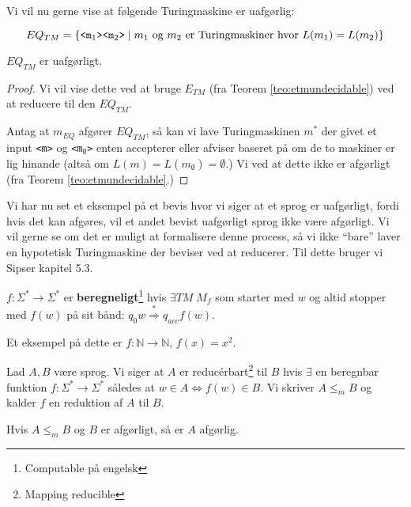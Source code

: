 Vi vil nu gerne vise at følgende Turingmaskine er uafgørlig:

\begin{equation*}
	EQ_{TM} = \{\text{\texttt{<m$_1$><m$_2$>}} \mid m_{1} \text{ og } m_{2} \text{ er Turingmaskiner hvor } L(m_{1}) = L(m_{2})\}
\end{equation*}

\begin{theorem}
	$EQ_{TM}$ er uafgørligt.
\end{theorem}

\begin{proof}
	Vi vil vise dette ved at bruge $E_{TM}$ (fra Teorem \ref{teo:etmundecidable}) ved at reducere til den $EQ_{TM}$.

	Antag at $m_{EQ}$ afgører $EQ_{TM}$, så kan vi lave Turingmaskinen $m^{*}$ der givet et input \texttt{<m>} og \texttt{<m$_{\emptyset}$>} enten accepterer eller afviser baseret på om de to maskiner er lig hinande (altså om $L(m) = L(m_{\emptyset}) = \emptyset$.) Vi ved at dette ikke er afgørligt (fra Teorem \ref{teo:etmundecidable}.)
\end{proof}

Vi har nu set et eksempel på et bevis hvor vi siger at et sprog er uafgørligt, fordi hvis det kan afgøres, vil et andet bevist uafgørligt sprog ikke være afgørligt. Vi vil gerne se om det er muligt at formalisere denne process, så vi ikke ``bare'' laver en hypotetisk Turingmaskine der beviser ved at reducerer. Til dette bruger vi Sipser kapitel 5.3.
\begin{definition}
	$f : \Sigma^{*} \rightarrow \Sigma^{*}$ er \textbf{beregneligt}\footnote{Computable på engelsk} hvis $\exists TM \;M_{f}$ som starter med $w$ og altid stopper med $f(w)$ på sit bånd: $q_{0}w \stackrel{*}{\Rightarrow} q_{acc}f(w)$.
\end{definition}

Et eksempel på dette er $f : \mathbb{N} \rightarrow \mathbb{N}$, $f(x) = x^{2}$.

\begin{definition}
	Lad $A, B$ være sprog. Vi siger at $A$ er reducérbart\footnote{Mapping reducible} til $B$ hvis $\exists$ en beregnbar funktion $f : \Sigma^{*} \rightarrow \Sigma^{*}$ således at $w \in A \iff f(w) \in B$. Vi skriver $A \le _{m}B$ og kalder $f$ en reduktion af $A$ til $B$.
\end{definition}

\begin{theorem}
	Hvis $A \leq _{m}B$ og $B$ er afgørligt, så er $A$ afgørlig.
\end{theorem}

